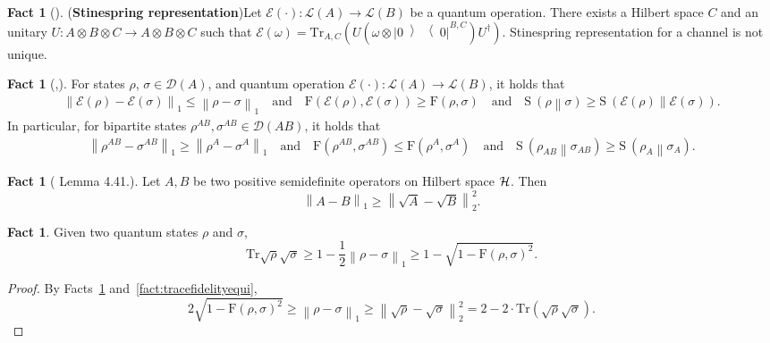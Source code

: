 \documentclass[11pt,a4paper]{article}
\def\F{\mathrn{F}}
\def\H{\CMcal{H}}
\theoremstyle{plain}
\theoremstyle{definition}
\newtheorem{fact}[theorem]{Fact}
\newcommand {\br} [1] {\ensuremath{ \left( #1 \right) }}
\newcommand {\minusspace} {\: \! \!}
\newcommand {\fn} [2] {\ensuremath{ #1 \minusspace \br{ #2 } }}
\newcommand {\norm} [1] {\ensuremath{ \left\| #1 \right\| }}
\newcommand {\normsub} [2] {\ensuremath{ \norm{#1}_{#2} }}
\newcommand {\onenorm} [1] {\normsub{#1}{1}}
\newcommand {\relent} [2] {\fn{\mathrm{S}}{#1 \middle\| #2}}
\newcommand {\ketbratwo} [2] {\ensuremath{ \left| #1 \middle\rangle \middle\langle #2 \right| }}
\newcommand {\ketbra} [1] {\ketbratwo{#1}{#1}}
\newcommand {\Tr} {\ensuremath{ \mathrm{Tr} }}
\newcommand {\myqedhere} {\tag*{\qedhere}}
\def\F{\mathrm{F}}
\def\E{\mathcal{E}}
\begin{document}
\begin{fact}[\cite{stinespring55}](\textbf{Stinespring representation})\label{stinespring}
Let $\E(\cdot): \mathcal{L}(A)\rightarrow \mathcal{L}(B)$ be a quantum operation. There exists a Hilbert space $C$ and an unitary $U: A \otimes B \otimes C \rightarrow A \otimes B\otimes C$ such that $\E(\omega)=\Tr_{A,C}\br{U (\omega  \otimes \ketbra{0}^{B,C}) U^{\dagger}}$. Stinespring representation for a channel is not unique. 
\end{fact}

\begin{fact}[\cite{barnum96},\cite{lindblad75}]
	\label{fact:monotonequantumoperation}
For states $\rho$, $\sigma \in \mathcal{D}(A)$, and quantum operation $\E(\cdot):\mathcal{L}(A)\rightarrow \mathcal{L}(B)$, it holds that
\begin{align*}
	\onenorm{\E(\rho) - \E(\sigma)} \leq \onenorm{\rho - \sigma} \quad \mbox{and} \quad \F(\E(\rho),\E(\sigma)) \geq \F(\rho,\sigma) \quad \mbox{and} \quad \relent{\rho}{\sigma}\geq \relent{\E(\rho)}{\E(\sigma)}.
\end{align*}
In particular, for bipartite states $\rho^{AB},\sigma^{AB}\in \mathcal{D}(AB)$, it holds that
\begin{align*}
	\onenorm{\rho^{AB} - \sigma^{AB}} \geq \onenorm{\rho^A - \sigma^A} \quad \mbox{and} \quad \F(\rho^{AB},\sigma^{AB}) \leq \F(\rho^A,\sigma^A) \quad \mbox{and} \quad \relent{\rho_{AB}}{\sigma_{AB}}\geq \relent{\rho_A}{\sigma_A} .
\end{align*}
\end{fact}

\begin{fact}[\cite{Watrouslecturenote} Lemma 4.41.]\label{fact:onenorm vs twonorm}
Let $A, B$ be two positive semidefinite operators on Hilbert space $\H$. Then
\[\onenorm{A-B}\geq\norm{\sqrt{A}-\sqrt{B}}^2_2.\]
\end{fact}
\begin{fact}\label{fact:fidelityvstrace}
Given two quantum states $\rho$ and $\sigma$, 
$$\Tr\sqrt{\rho}\sqrt{\sigma}\geq 1 - \frac{1}{2} \onenorm{ \rho - \sigma} \geq 1-\sqrt{1-\F(\rho,\sigma)^2} .$$
\end{fact}
\begin{proof}
By  Facts~\ref{fact:onenorm vs twonorm} and~\ref{fact:tracefidelityequi},
\[2\sqrt{1-\F(\rho,\sigma)^2}\geq \onenorm{ \rho - \sigma } \geq\norm{\sqrt{\rho}-\sqrt{\sigma}}_2^2=2-2 \cdot \Tr\br{\sqrt{\rho}\sqrt{\sigma}}. \myqedhere\]
\end{proof}
\end{document}
